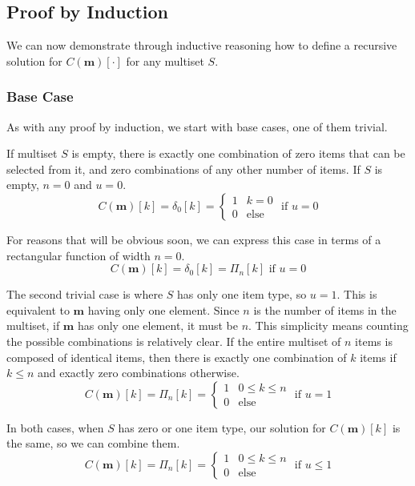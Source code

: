 \documentclass{article}
\begin{document}
\subsection{Proof by Induction}

We can now demonstrate through inductive reasoning how to define a recursive solution for $C(\bm{m})[\cdot]$ for any multiset $S$.

\subsubsection{Base Case}

As with any proof by induction, we start with base cases, one of them trivial. 

If multiset $S$ is empty, there is exactly one combination of zero items that can be selected from it, and zero combinations of any other number of items. If $S$ is empty, $n=0$ and $u=0$.
\begin{equation}
    C(\bm{m})[k] = \delta_0[k] = \begin{cases}1 & k = 0 \\ 0 & \text{else}  \end{cases} \text{ if } u=0
\end{equation}

For reasons that will be obvious soon, we can express this case in terms of a rectangular function of width $n=0$.
\begin{equation}
    C(\bm{m})[k] = \delta_0[k] = \Pi_n[k] \text{ if } u=0
\end{equation}

The second trivial case is where $S$ has only one item type, so $u=1$. This is equivalent to $\bm{m}$ having only one element. Since $n$ is the number of items in the multiset, if $\bm{m}$ has only one element, it must be $n$. This simplicity means counting the possible combinations is relatively clear. If the entire multiset of $n$ items is composed of identical items, then there is exactly one combination of $k$ items if $k \leq n$ and exactly zero combinations otherwise.
\begin{equation}
    C(\bm{m})[k] = \Pi_n[k] = \begin{cases}1 & 0 \leq k \leq n \\ 0 & \text{else}  \end{cases}\text{ if } u = 1
\end{equation}

In both cases, when $S$ has zero or one item type, our solution for $C(\bm{m})[k]$ is the same, so we can combine them.
\begin{equation}
    C(\bm{m})[k] = \Pi_n[k] = \begin{cases}1 & 0 \leq k \leq n \\ 0 & \text{else}  \end{cases}\text{ if } u\leq 1
\end{equation}
\end{document}
